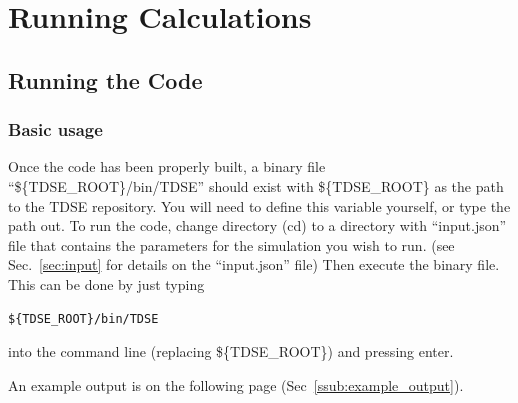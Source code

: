 \documentclass{article}
\begin{document}


\section{Running Calculations} %
\label{sec:running_tdse_and_best_practices}
\subsection{Running the Code} %
\label{sub:running_the_code}
\subsubsection{Basic usage} %
\label{ssub:basic_usage}
Once the code has been properly built, a binary file ``\$\{TDSE\_ROOT\}/bin/TDSE'' should exist with \$\{TDSE\_ROOT\} as the path to the TDSE repository. You will need to define this variable yourself, or type the path out. To run the code, change directory (cd) to a directory with ``input.json'' file that contains the parameters for the simulation you wish to run. (see Sec.~\ref{sec:input} for details on the ``input.json'' file) Then execute the binary file. This can be done by just typing
\begin{verbatim}
${TDSE_ROOT}/bin/TDSE
\end{verbatim}
into the command line (replacing \$\{TDSE\_ROOT\}) and pressing enter.

An example output is on the following page (Sec~\ref{ssub:example_output}).
\newpage
\end{document}
